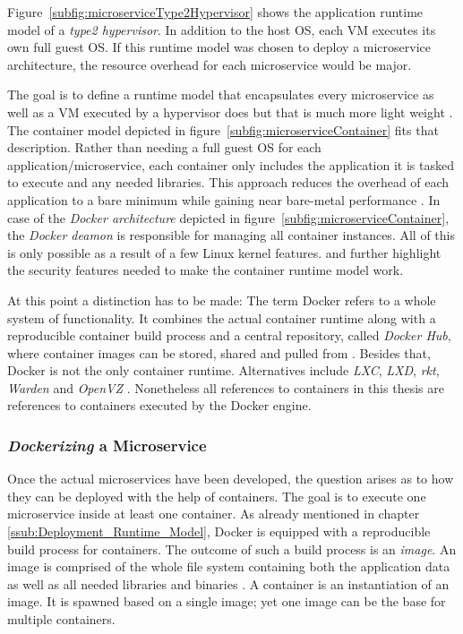 Figure~\ref{subfig:microserviceType2Hypervisor} shows the application runtime
model of a \textit{type2 hypervisor}. In addition to the host \ac{OS}, each
\ac{VM} executes its own full guest \ac{OS}. If this runtime model was chosen
to deploy a microservice architecture, the resource overhead for each
microservice would be major.

The goal is to define a runtime model that encapsulates every microservice as
well as a \ac{VM} executed by a hypervisor does but that is much more light
weight \autocite{SchenkerLearnDockerFundamentals2018}. The container model
depicted in figure~\ref{subfig:microserviceContainer} fits that description.
Rather than needing a full guest \ac{OS} for each application/microservice,
each container only includes the application it is tasked to execute and any
needed libraries. This approach reduces the overhead of each application to a
bare minimum while gaining near bare-metal performance \autocite[Ch.
1A]{CombeDockerNotDocker2016}. In case of the \textit{Docker architecture}
depicted in figure~\ref{subfig:microserviceContainer}, the \textit{Docker
deamon} is responsible for managing all container instances. All of this is
only possible as a result of a few Linux kernel features.
\autocite{CombeDockerNotDocker2016} and \autocite[Ch.
1.2.1]{LuksaKubernetesAction2017} further highlight the security features
needed to make the container runtime model work.

At this point a distinction has to be made: The term Docker refers to a whole
system of functionality. It combines the actual container runtime along with a
reproducible container build process and a central repository, called
\textit{Docker Hub}, where container images can be stored, shared and pulled
from \autocite[Ch. 1B]{CombeDockerNotDocker2016}. Besides that, Docker is not
the only container runtime. Alternatives include \textit{LXC}, \textit{LXD},
\textit{rkt}, \textit{Warden} and \textit{OpenVZ} \autocite[Tab.
1]{CombeDockerNotDocker2016}. Nonetheless all references to containers in this
thesis are references to containers executed by the Docker engine.

\subsubsection{\textit{Dockerizing} a Microservice}%
\label{ssub:Dockerizing_a_Microservice}

Once the actual microservices have been developed, the question arises as to
how they can be deployed with the help of containers. The goal is to execute
one microservice inside at least one container. As already mentioned in chapter
\ref{ssub:Deployment_Runtime_Model}, Docker is equipped with a reproducible
build process for containers. The outcome of such a build process is an
\textit{image}. An image is comprised of the whole file system containing both the
application data as well as all needed libraries and binaries \autocite[Ch.
1]{LuksaKubernetesAction2017}. A container is an instantiation of an image. It
is spawned based on a single image; yet one image can be the base for multiple
containers.

